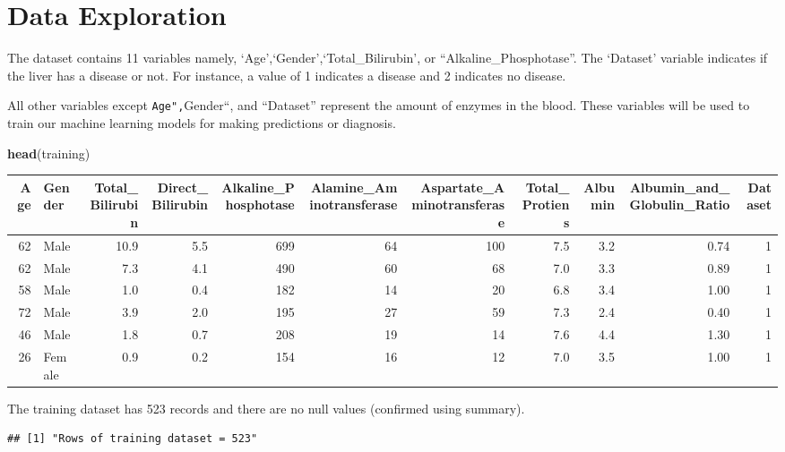 \documentclass[]{article}
\newenvironment{Shaded}{\begin{snugshade}}{\end{snugshade}}
\newcommand{\KeywordTok}[1]{\textcolor[rgb]{0.13,0.29,0.53}{\textbf{#1}}}
\newcommand{\NormalTok}[1]{#1}
\newcommand{\StringTok}[1]{\textcolor[rgb]{0.31,0.60,0.02}{#1}}
\begin{document}
\section{Data Exploration}
\label{sec:exploration}

The dataset contains 11 variables namely,
`Age',`Gender',`Total\_Bilirubin', or ``Alkaline\_Phosphotase''. The
`Dataset' variable indicates if the liver has a disease or not. For
instance, a value of 1 indicates a disease and 2 indicates no disease.

All other variables except \texttt{Age",}Gender``, and ``Dataset''
represent the amount of enzymes in the blood. These variables will be
used to train our machine learning models for making predictions or
diagnosis.

\small

\begin{Shaded}
\begin{Highlighting}[]
\KeywordTok{head}\NormalTok{(training)}
\end{Highlighting}
\end{Shaded}

\begin{longtable}[]{@{}rlrrrrrrrrr@{}}
\toprule
Age & Gender & Total\_Bilirubin & Direct\_Bilirubin &
Alkaline\_Phosphotase & Alamine\_Aminotransferase &
Aspartate\_Aminotransferase & Total\_Protiens & Albumin &
Albumin\_and\_Globulin\_Ratio & Dataset\tabularnewline
\midrule
\endhead
62 & Male & 10.9 & 5.5 & 699 & 64 & 100 & 7.5 & 3.2 & 0.74 &
1\tabularnewline
62 & Male & 7.3 & 4.1 & 490 & 60 & 68 & 7.0 & 3.3 & 0.89 &
1\tabularnewline
58 & Male & 1.0 & 0.4 & 182 & 14 & 20 & 6.8 & 3.4 & 1.00 &
1\tabularnewline
72 & Male & 3.9 & 2.0 & 195 & 27 & 59 & 7.3 & 2.4 & 0.40 &
1\tabularnewline
46 & Male & 1.8 & 0.7 & 208 & 19 & 14 & 7.6 & 4.4 & 1.30 &
1\tabularnewline
26 & Female & 0.9 & 0.2 & 154 & 16 & 12 & 7.0 & 3.5 & 1.00 &
1\tabularnewline
\bottomrule
\end{longtable}

The training dataset has 523 records and there are no null values
(confirmed using summary).

\begin{Shaded}
\end{Shaded}

\begin{verbatim}
## [1] "Rows of training dataset = 523"
\end{verbatim}
\end{document}
